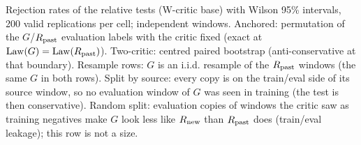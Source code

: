 Rejection rates of the relative tests (W-critic base) with Wilson 95\% intervals, 200 valid replications per cell; independent windows. Anchored: permutation of the $G$/$R_{\rm past}$ evaluation labels with the critic fixed (exact at $\mathrm{Law}(G)=\mathrm{Law}(R_{\rm past})$). Two-critic: centred paired bootstrap (anti-conservative at that boundary).
Resample rows: $G$ is an i.i.d. resample of the $R_{\rm past}$ windows (the same $G$ in both rows). Split by source: every copy is on the train/eval side of its source window, so no evaluation window of $G$ was seen in training (the test is then conservative). Random split: evaluation copies of windows the critic saw as training negatives make $G$ look less like $R_{\rm new}$ than $R_{\rm past}$ does (train/eval leakage); this row is not a size.
